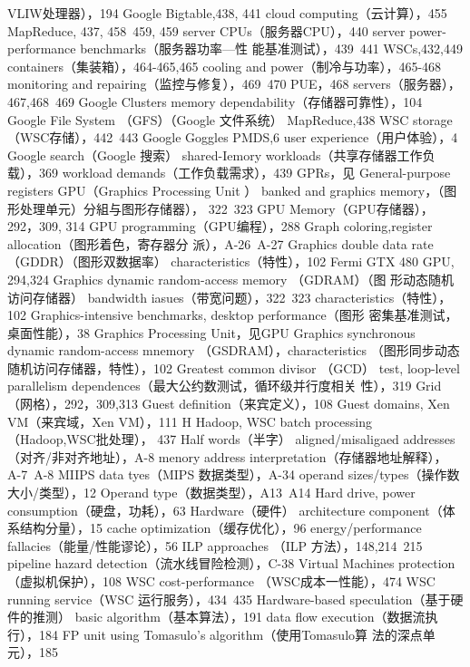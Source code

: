 VLIW处理器），194
Google
Bigtable,438, 441
cloud computing（云计算），455
MapReduce, 437, 458~459, 459
server CPUs（服务器CPU），440
server power-performance benchmarks（服务器功率—性
能基准测试），439~441
WSCs,432,449
containers（集装箱），464-465,465
cooling and power（制冷与功率），465-468
monitoring and repairing（监控与修复），469~470
PUE，468
servers（服务器），467,468~469
Google Clusters
memory dependability（存储器可靠性），104
Google File System （GFS）（Google 文件系统）
MapReduce,438
WSC storage（WSC存储），442~443
Google Goggles
PMDS,6
user experience（用户体验），4
Google search（Google 搜索）
shared-Iemory workloads（共享存储器工作负载），369
workload demands（工作负载需求），439
GPRs，见 General-purpose registers
GPU（Graphics Processing Unit ） banked and graphics
memory，（图形处理单元）分組与图形存储器），
322~323
GPU Memory（GPU存储器），292，309, 314
GPU programming（GPU编程），288
Graph coloring,register allocation（图形着色，寄存器分
派），A-26~A-27
Graphics double data rate（GDDR）（图形双数据率）
characteristics（特性），102
Fermi GTX 480 GPU, 294,324
Graphics dynamic random-access memory （GDRAM）（图
形动态随机访问存储器）
bandwidth iasues（带宽问题），322~323
characteristics（特性），102
Graphics-intensive benchmarks, desktop performance（图形
密集基准测试，桌面性能），38
Graphics Processing Unit，见GPU
Graphics synchronous dynamic random-access mnemory
（GSDRAM），characteristics
（图形同步动态随机访问存储器，特性），102
Greatest common divisor （GCD） test, loop-level parallelism
dependences（最大公约数测试，循环级并行度相关
性），319
Grid（网格），292，309,313
Guest definition（来宾定义），108
Guest domains, Xen VM（来宾域，Xen VM），111
H
Hadoop, WSC batch processing （Hadoop,WSC批处理），
437
Half words（半字）
aligned/misaligaed addresses（对齐/非对齐地址），A-8
menory address interpretation（存储器地址解释），
A-7~A-8
MIIPS data tyes（MIPS 数据类型），A-34
operand sizes/types（操作数大小/类型），12
Operand type（数据类型），A13~A14
Hard drive, power consumption（硬盘，功耗），63
Hardware（硬件）
architecture component（体系结构分量），15
cache optimization（缓存优化），96
energy/performance fallacies（能量/性能谬论），56
ILP approaches （ILP 方法），148,214~215
pipeline hazard detection（流水线冒险检测），C-38
Virtual Machines protection（虚拟机保护），108
WSC cost-performance （WSC成本一性能），474
WSC running service（WSC 运行服务），434~435
Hardware-based speculation（基于硬件的推测）
basic algorithm（基本算法），191
data flow execution（数据流执行），184
FP unit using Tomasulo's algorithm（使用Tomasulo算
法的深点单元），185

